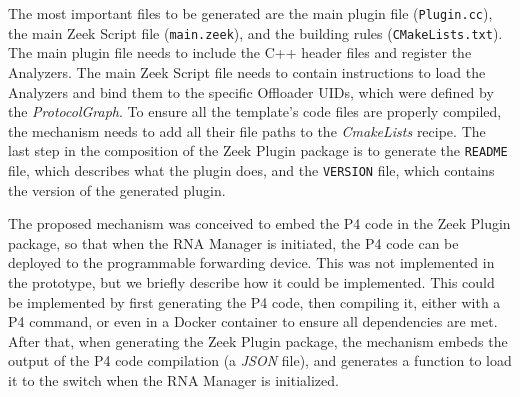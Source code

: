 The most important files to be generated are the main plugin file (\texttt{Plugin.cc}), the main Zeek Script file (\texttt{main.zeek}), and the building rules (\texttt{CMakeLists.txt}). The main plugin file needs to include the C++ header files and register the Analyzers. The main Zeek Script file needs to contain instructions to load the Analyzers and bind them to the specific Offloader UIDs, which were defined by the \textit{ProtocolGraph}. To ensure all the template's code files are properly compiled, the mechanism needs to add all their file paths to the \textit{CmakeLists} recipe. The last step in the composition of the Zeek Plugin package is to generate the \texttt{README} file, which describes what the plugin does, and the \texttt{VERSION} file, which contains the version of the generated plugin.

The proposed mechanism was conceived to embed the P4 code in the Zeek Plugin package, so that when the RNA Manager is initiated, the P4 code can be deployed to the programmable forwarding device. This was not implemented in the prototype, but we briefly describe how it could be implemented. This could be implemented by first generating the P4 code, then compiling it, either with a P4 command, or even in a Docker container to ensure all dependencies are met. After that, when generating the Zeek Plugin package, the mechanism embeds the output of the P4 code compilation (a \textit{JSON} file), and generates a function to load it to the switch when the RNA Manager is initialized.

